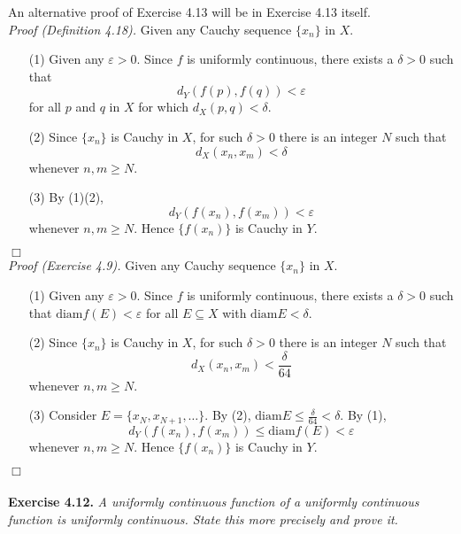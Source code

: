 \documentclass{article}
\begin{document}
An alternative proof of Exercise 4.13 will be in Exercise 4.13 itself. \\

\emph{Proof (Definition 4.18).}
Given any Cauchy sequence $\{x_n\}$ in $X$.
\begin{enumerate}
\item[(1)]
Given any $\varepsilon > 0$.
Since $f$ is uniformly continuous, there exists a $\delta > 0$ such that
\[
  d_Y(f(p),f(q)) < \varepsilon
\]
for all $p$ and $q$ in $X$ for which $d_X(p,q) < \delta$.

\item[(2)]
Since $\{x_n\}$ is Cauchy in $X$, for such $\delta > 0$ there is an integer $N$ such that
\[
  d_X(x_n,x_m) < \delta
\]
whenever $n, m \geq N$.

\item[(3)]
By (1)(2),
\[
  d_Y(f(x_n),f(x_m)) < \varepsilon
\]
whenever $n, m \geq N$.
Hence $\{f(x_n)\}$ is Cauchy in $Y$.
\end{enumerate}
$\Box$ \\



\emph{Proof (Exercise 4.9).}
Given any Cauchy sequence $\{x_n\}$ in $X$.
\begin{enumerate}
\item[(1)]
Given any $\varepsilon > 0$.
Since $f$ is uniformly continuous, there exists a $\delta > 0$ such that
$\mathrm{diam}f(E) < \varepsilon$ for all $E \subseteq X$ with
$\mathrm{diam}E < \delta$.

\item[(2)]
Since $\{x_n\}$ is Cauchy in $X$, for such $\delta > 0$ there is an integer $N$ such that
\[
  d_X(x_n,x_m) < \frac{\delta}{64}
\]
whenever $n, m \geq N$.

\item[(3)]
Consider $E = \{ x_N, x_{N+1}, \ldots \}$.
By (2), $\mathrm{diam}E \leq \frac{\delta}{64} < \delta$.
By (1),
\[
  d_Y(f(x_n),f(x_m)) \leq \mathrm{diam}f(E) < \varepsilon
\]
whenever $n, m \geq N$.
Hence $\{f(x_n)\}$ is Cauchy in $Y$.
\end{enumerate}
$\Box$ \\\\






\textbf{Exercise 4.12.}
\emph{A uniformly continuous function of a uniformly continuous function
is uniformly continuous. State this more precisely and prove it.} \\
\end{document}
